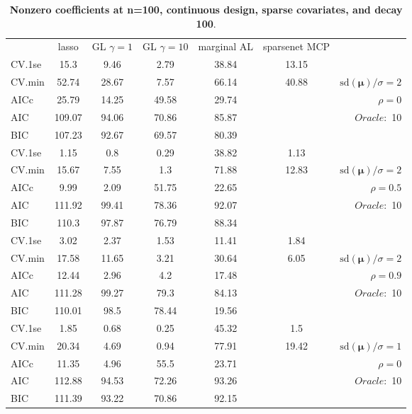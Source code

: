\clearpage
\begin{table}\vspace{-.5cm}
\caption[l]{ { \bf Nonzero coefficients at n=100, continuous design, 
sparse covariates, and  decay  100}.}
\vspace{-.5cm}
\footnotesize{}
\begin{center}
\begin{tabular}{l*{5}{c}|r}
& lasso & GL $\gamma=1$ & GL $\gamma=10$ & marginal AL & sparsenet MCP  & \\
 \cline{1-7}
CV.1se & 15.3 & 9.46 & 2.79 & 38.84 & 13.15 & \\
CV.min & 52.74 & 28.67 & 7.57 & 66.14 & 40.88 &  $\mathrm{sd}(\mathbf{\mu})/\sigma=2$ \\
AICc & 25.79 & 14.25 & 49.58 & 29.74 & & $\rho=0$ \\
AIC & 109.07 & 94.06 & 70.86 & 85.87 & &  \multirow{2}{*}{$Oracle: $ 10} \\
BIC & 107.23 & 92.67 & 69.57 & 80.39 & &  \\
 \hline 
CV.1se & 1.15 & 0.8 & 0.29 & 38.82 & 1.13 & \\
CV.min & 15.67 & 7.55 & 1.3 & 71.88 & 12.83 &  $\mathrm{sd}(\mathbf{\mu})/\sigma=2$ \\
AICc & 9.99 & 2.09 & 51.75 & 22.65 & & $\rho=0.5$ \\
AIC & 111.92 & 99.41 & 78.36 & 92.07 & &  \multirow{2}{*}{$Oracle: $ 10} \\
BIC & 110.3 & 97.87 & 76.79 & 88.34 & &  \\
 \hline 
CV.1se & 3.02 & 2.37 & 1.53 & 11.41 & 1.84 & \\
CV.min & 17.58 & 11.65 & 3.21 & 30.64 & 6.05 &  $\mathrm{sd}(\mathbf{\mu})/\sigma=2$ \\
AICc & 12.44 & 2.96 & 4.2 & 17.48 & & $\rho=0.9$ \\
AIC & 111.28 & 99.27 & 79.3 & 84.13 & &  \multirow{2}{*}{$Oracle: $ 10} \\
BIC & 110.01 & 98.5 & 78.44 & 19.56 & &  \\
 \hline 
CV.1se & 1.85 & 0.68 & 0.25 & 45.32 & 1.5 & \\
CV.min & 20.34 & 4.69 & 0.94 & 77.91 & 19.42 &  $\mathrm{sd}(\mathbf{\mu})/\sigma=1$ \\
AICc & 11.35 & 4.96 & 55.5 & 23.71 & & $\rho=0$ \\
AIC & 112.88 & 94.53 & 72.26 & 93.26 & &  \multirow{2}{*}{$Oracle: $ 10} \\
BIC & 111.39 & 93.22 & 70.86 & 92.15 & &  \\

\end{tabular}
\end{center}
\end{table}
